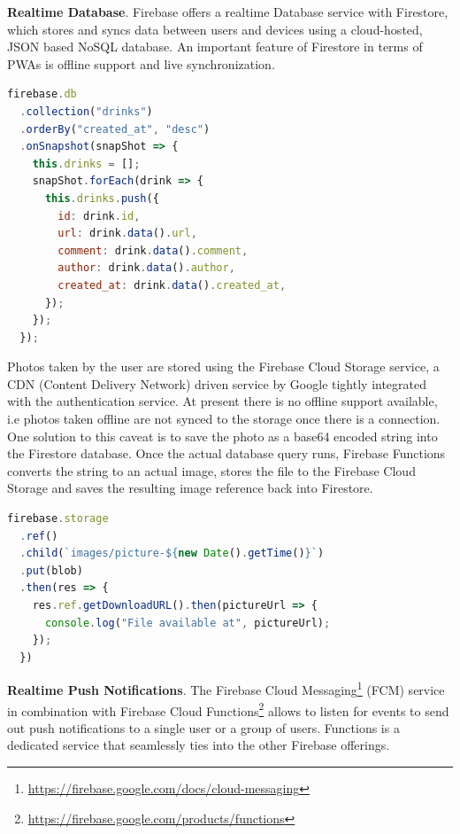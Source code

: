 \textbf{Realtime Database}. Firebase offers a realtime Database service with Firestore, which stores and syncs data between users and devices using a cloud-hosted, JSON based NoSQL database. An important feature of Firestore in terms of PWAs is offline support and live synchronization.

\begin{lstlisting}[language=JavaScript, caption=Realtime query for new posts (Home.vue), label=lst:firebase-listposts]
firebase.db
  .collection("drinks")
  .orderBy("created_at", "desc")
  .onSnapshot(snapShot => {
    this.drinks = [];
    snapShot.forEach(drink => {
      this.drinks.push({
        id: drink.id,
        url: drink.data().url,
        comment: drink.data().comment,
        author: drink.data().author,
        created_at: drink.data().created_at,
      });
    });
  });
\end{lstlisting}

Photos taken by the user are stored using the Firebase Cloud Storage service, a CDN (Content Delivery Network) driven service by Google tightly integrated with the authentication service. At present there is no offline support available, i.e photos taken offline are not synced to the storage once there is a connection. One solution to this caveat is to save the photo as a base64 encoded string into the Firestore database. Once the actual database query runs, Firebase Functions converts the string to an actual image, stores the file to the Firebase Cloud Storage and saves the resulting image reference back into Firestore.

\begin{lstlisting}[language=JavaScript, caption=Store a photo to Firebase Cloud Storage (Camera.vue), label=lst:firebase-photos]
firebase.storage
  .ref()
  .child(`images/picture-${new Date().getTime()}`)
  .put(blob)
  .then(res => {
    res.ref.getDownloadURL().then(pictureUrl => {
      console.log("File available at", pictureUrl);
    });
  })
\end{lstlisting}

\textbf{Realtime Push Notifications}. The Firebase Cloud Messaging\footnote{\url{https://firebase.google.com/docs/cloud-messaging}} (FCM) service in combination with Firebase Cloud Functions\footnote{\url{https://firebase.google.com/products/functions}} allows to listen for events to send out push notifications to a single user or a group of users.  Functions is a dedicated service that seamlessly ties into the other Firebase offerings.

